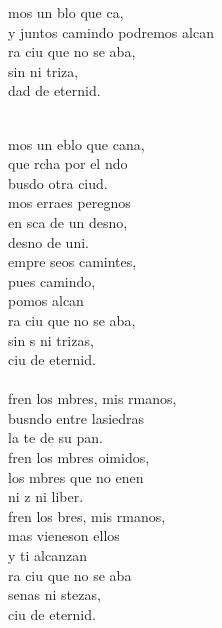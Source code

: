 \begin{cancion}%
	\begin{chorus}%
	mos un blo que ca,\\
	y juntos camindo podremos alcan\\
	ra ciu que no se aba,\\
	sin  ni triza,\\
	dad de eternid.\\
	\end{chorus}%
	\jump\\
	mos un eblo que cana,\\
	que rcha por el ndo\\
	busdo otra ciud.\\
	mos erraes peregnos\\
	en sca de un desno,\\
	desno de uni.\\
	empre seos camintes,\\
	pues  camindo,\\
	pomos alcan\\
	ra ciu que no se aba,\\
	sin s ni trizas,\\
	ciu de eternid.\\
\jump\\
	fren los mbres, mis rmanos,\\
	busndo entre lasiedras\\
	la te de su pan.\\
	fren los mbres oimidos,\\
	los mbres que no enen\\
	ni z ni liber.\\
	fren los bres, mis rmanos,\\
	mas vieneson ellos\\
	y ti alcanzan\\
	ra ciu que no se aba\\
	senas ni stezas,\\
	ciu de eternid.\\
\end{cancion}%
